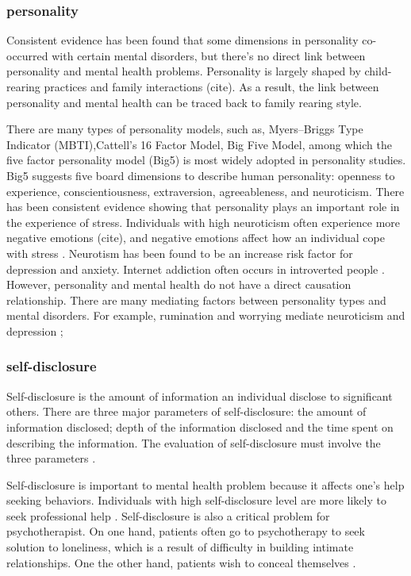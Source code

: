 \subsubsection{personality}

Consistent evidence has been found that some dimensions in personality co-occurred with certain mental disorders, but there's no direct link between personality and mental health problems. Personality is largely shaped by child-rearing practices and family interactions (cite). As a result, the link between personality and mental health can be traced back to family rearing style.

There are many types of personality models, such as, Myers–Briggs Type Indicator (MBTI),Cattell’s 16 Factor Model, Big Five Model, among which the five factor personality model (Big5) is most widely adopted in personality studies. Big5 suggests five board dimensions to describe human personality:  openness to experience, conscientiousness, extraversion, agreeableness, and neuroticism. There has been consistent evidence showing that personality plays an important role in the experience of stress. Individuals with high neuroticism often experience more negative emotions (cite), and negative emotions affect how an individual cope with stress \cite{kiecolt2002emotions}. Neurotism has been found to be an increase risk factor for depression and anxiety. \cite{talley1986association,cattell1961meaning} Internet addiction often occurs in introverted people \cite{xiuqin2010mental}. However, personality and mental health do not have a direct causation relationship. There are many mediating factors between personality types and mental disorders. For example, rumination and worrying mediate neuroticism and depression \cite{roelofs2008rumination};

\subsubsection{self-disclosure}
Self-disclosure is the amount of information an individual disclose to significant others. There are three major parameters of self-disclosure: the amount of information disclosed; depth of the information disclosed and the time spent on describing the information. The evaluation of self-disclosure must involve the three parameters \cite{cozby1973self}.


Self-disclosure is important to mental health problem because it affects one's help seeking behaviors. Individuals with high self-disclosure level are more likely to seek professional help \cite{hinson1993willingness}. Self-disclosure is also a critical problem for psychotherapist. On one hand, patients often go to psychotherapy to seek solution to loneliness, which is a result of difficulty in building intimate relationships. One the other hand, patients wish to conceal themselves \cite{fisher1990shared, stricker1990self}. 

